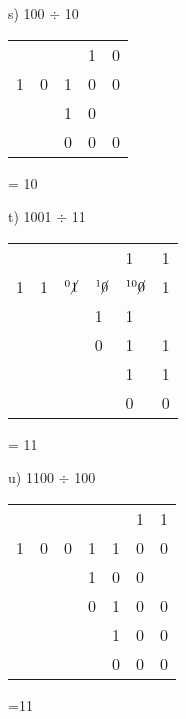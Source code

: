 \begin{figure}[H]
    \begin{minipage}[t]{0.45\textwidth}
        s) 100 $\div$ 10
        \begin{table}[H]
            \centering
            \begin{tabularx}{0.5\linewidth}{XXXXX}
              &  &  & 1 & 0 \\
            \cline{3-5}
            1 & 0 & \multicolumn{1}{|X}{1} & 0 & 0 \\
              &  & 1 & 0 &  \\
              \cline{3-4}
              &  & 0 & 0 & 0 \\
            \end{tabularx}
        \end{table}
        = 10
    \end{minipage}\hfill
    \begin{minipage}[t]{0.45\textwidth}
        t) 1001 $\div$ 11
        \begin{table}[H]
            \centering
            \begin{tabularx}{0.75\linewidth}{XXXXXX}
              &  &  &  & 1 & 1\\
            \cline{3-6}
            1 & 1 & \multicolumn{1}{|X}{$^0\cancel{1}$} & $^1\cancel{0}$ & $^{10}\cancel{0}$ & 1\\
              &  &  & 1 & 1 & \\
              \cline{4-5}
              &  &  & 0 & 1 & 1 \\
              &  &  &  & 1 & 1 \\
              \cline{5-6}
              &  &  &  & 0 & 0 \\  
            \end{tabularx}
        \end{table}
        = 11
    \end{minipage}\hfill
\end{figure}

\begin{figure}[H]
    \begin{minipage}[t]{0.45\textwidth}
        u) 1100 $\div$ 100
        \begin{table}[H]
            \centering
            \begin{tabularx}{0.7\linewidth}{XXXXXXX}
             & & & & & 1 & 1\\
             \cline{4-7}
             1& 0& 0&\multicolumn{1}{|X}{1} &1 &0 &0 \\
             & & & 1& 0& 0& \\
             \cline{4-6}
             & & & 0&1 &0 &0 \\
             & & & & 1& 0& 0\\
            \cline{5-7}
             & & & &0 &0 &0 \\
            \end{tabularx}
        \end{table}
        =11
    \end{minipage}\hfill
    \begin{minipage}[t]{0.45\textwidth}
        
    \end{minipage}\hfill
\end{figure}
